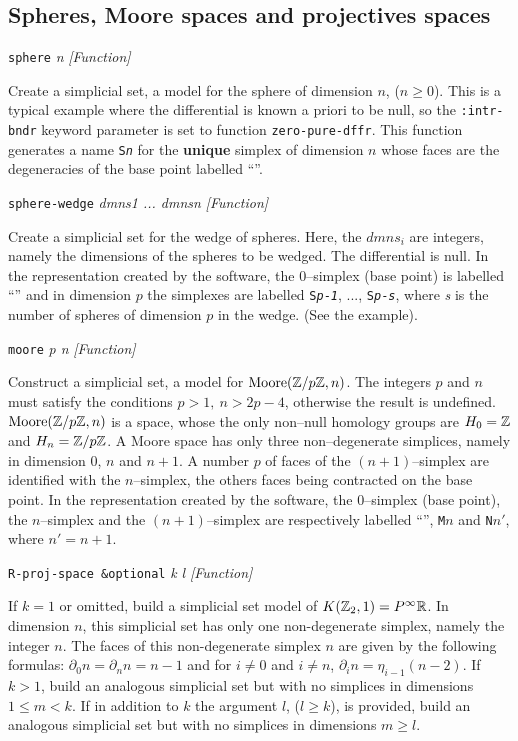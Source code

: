 \subsection {Spheres, Moore spaces and projectives spaces}
{\parindent=0mm
{\leftskip=5mm 
{\tt sphere} {\em n} \hfill {\em [Function]} \par}
{\leftskip=15mm 
Create a simplicial set, a model  for the sphere of dimension $n$, ($n \geq 0$). 
This is a typical example where the differential is known a priori to be null, so the {\tt :intr-bndr}
keyword parameter is set to function {\tt zero-pure-dffr}.
This function generates a name {\tt S{\em n}} for the {\bf unique} simplex of dimension $n$
whose faces are the degeneracies of the base point labelled ``{\tt *}''.  \par}  
{\leftskip=5mm 
{\tt sphere-wedge} {\em dmns1 ... dmnsn} \hfill {\em [Function]} \par}
{\leftskip=15mm 
Create a simplicial set for the wedge of spheres. Here, the $dmns_i$ are integers,
namely the dimensions of the spheres to be wedged. The differential is null.
In the  representation created by the software, the $0$--simplex (base point) is labelled
``{\tt *}'' and in dimension $p$ the simplexes are labelled {\tt S{\em p}-{\em 1}}, ..., 
{\tt S{\em p}-{\em s}},  where
{\em s} is the number of spheres of dimension $p$ in the wedge. (See the example). \par}
{\leftskip=5mm 
{\tt moore} {\em  p n} \hfill {\em [Function]}\par}
{\leftskip=15mm 
Construct a simplicial set, a model for  ${\rm Moore}({{\Bbb Z}}/{p{{\Bbb Z}}},n)$. 
The integers $p$ and $n$ must satisfy  the conditions $p>1,\ n> 2p-4$, otherwise
the result is undefined. 
${\rm Moore}({{\Bbb Z}}/{p{{\Bbb Z}}},n)$ is a space, whose the only non--null homology groups are $H_0={{\Bbb Z}}$
and $H_n={{\Bbb Z}}/{p{{\Bbb Z}}}$. A Moore space has only three non--degenerate simplices, namely in dimension
$0$, $n$ and $n+1$. A number $p$ of faces of the  $(n+1)$--simplex are identified with the $n$--simplex, 
the others faces being contracted on the base point.
In the  representation created by the software, the $0$--simplex (base point),
the $n$--simplex and the $(n+1)$--simplex are respectively labelled
``{\tt *}'', {\tt M{$n$}} and {\tt N{$n'$}}, where $n'=n+1$. \par}
{\leftskip=5mm 
{\tt R-proj-space \&optional} {\em k l} \hfill {\em [Function]} \par}
{\leftskip=15mm 
If $k=1$ or omitted, build a simplicial set model of $K({{\Bbb Z}}_2,1)= P^\infty {{\Bbb R}}$. 
In dimension $n$, this simplicial set has only one non-degenerate simplex, namely the integer $n$. 
The faces of this non-degenerate simplex $n$ are given by the following formulas:
$\partial_0 n = \partial_n n = n-1$ and for $i \not= 0$ and $i \not=n$,  $\partial_i n= \eta_{i-1} (n-2)$.  
If $k >1$, build an 
analogous simplicial set but with no simplices in dimensions $1 \leq m < k$. If in addition to $k$ 
the argument $l$, ($l \geq k$), is provided, build
an analogous simplicial set but with no simplices in dimensions $m \geq l$. \par 
}

}
